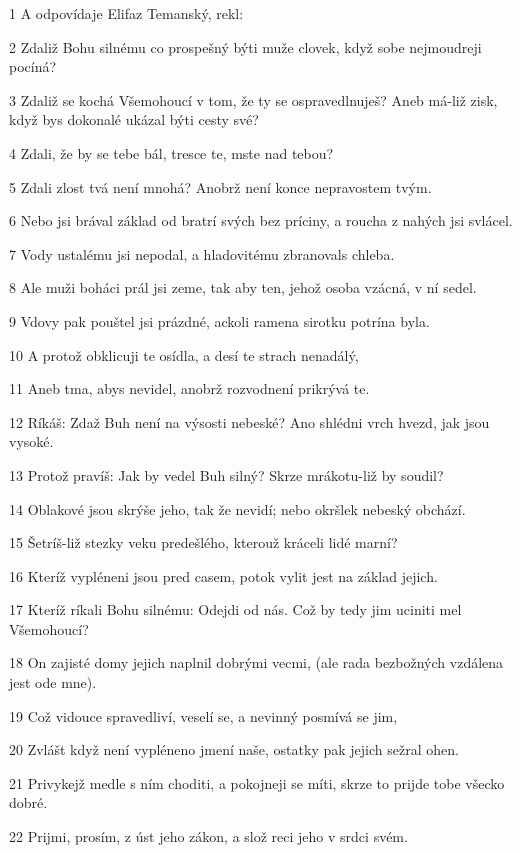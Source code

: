 \par 1 A odpovídaje Elifaz Temanský, rekl:
\par 2 Zdaliž Bohu silnému co prospešný býti muže clovek, když sobe nejmoudreji pocíná?
\par 3 Zdaliž se kochá Všemohoucí v tom, že ty se ospravedlnuješ? Aneb má-liž zisk, když bys dokonalé ukázal býti cesty své?
\par 4 Zdali, že by se tebe bál, tresce te, mste nad tebou?
\par 5 Zdali zlost tvá není mnohá? Anobrž není konce nepravostem tvým.
\par 6 Nebo jsi brával základ od bratrí svých bez príciny, a roucha z nahých jsi svlácel.
\par 7 Vody ustalému jsi nepodal, a hladovitému zbranovals chleba.
\par 8 Ale muži boháci prál jsi zeme, tak aby ten, jehož osoba vzácná, v ní sedel.
\par 9 Vdovy pak pouštel jsi prázdné, ackoli ramena sirotku potrína byla.
\par 10 A protož obklicuji te osídla, a desí te strach nenadálý,
\par 11 Aneb tma, abys nevidel, anobrž rozvodnení prikrývá te.
\par 12 Ríkáš: Zdaž Buh není na výsosti nebeské? Ano shlédni vrch hvezd, jak jsou vysoké.
\par 13 Protož pravíš: Jak by vedel Buh silný? Skrze mrákotu-liž by soudil?
\par 14 Oblakové jsou skrýše jeho, tak že nevidí; nebo okršlek nebeský obchází.
\par 15 Šetríš-liž stezky veku predešlého, kterouž kráceli lidé marní?
\par 16 Kteríž vypléneni jsou pred casem, potok vylit jest na základ jejich.
\par 17 Kteríž ríkali Bohu silnému: Odejdi od nás. Což by tedy jim uciniti mel Všemohoucí?
\par 18 On zajisté domy jejich naplnil dobrými vecmi, (ale rada bezbožných vzdálena jest ode mne).
\par 19 Což vidouce spravedliví, veselí se, a nevinný posmívá se jim,
\par 20 Zvlášt když není vypléneno jmení naše, ostatky pak jejich sežral ohen.
\par 21 Privykejž medle s ním choditi, a pokojneji se míti, skrze to prijde tobe všecko dobré.
\par 22 Prijmi, prosím, z úst jeho zákon, a slož reci jeho v srdci svém.
